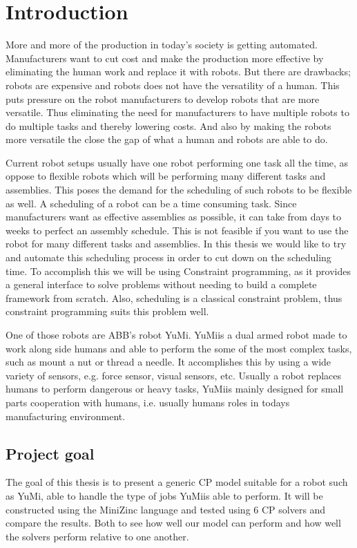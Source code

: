 \chapter{Introduction} 

More and more of the production in today's society is getting automated. Manufacturers want to cut cost and make the production more effective by eliminating the human work and replace it with robots. But there are drawbacks; robots are expensive and robots does not have the versatility of a human. This puts pressure on the robot manufacturers to develop robots that are more versatile. Thus eliminating the need for manufacturers to have multiple robots to do multiple tasks and thereby lowering costs. And also by making the robots more versatile the close the gap of what a human and robots are able to do.

Current robot setups usually have one robot performing one task all the time, as oppose to flexible robots which will be performing many different tasks and assemblies. This poses the demand for the scheduling of such robots to be flexible as well. A scheduling of a robot can be a time consuming task. Since manufacturers want as effective assemblies as possible, it can take from days to weeks to perfect an assembly schedule. This is not feasible if you want to use the robot for many different tasks and assemblies. In this thesis we would like to try and automate this scheduling process in order to cut down on the scheduling time. To accomplish this we will be using Constraint programming, as it provides a general interface to solve problems without needing to build a complete framework from scratch. Also, scheduling is a classical constraint problem, thus constraint programming suits this problem well.

One of those robots are ABB's robot YuMi\textsuperscript\textregistered. YuMi\textsuperscript\textregistered is a dual armed robot made to work along side humans and able to perform the some of the most complex tasks, such as mount a nut or thread a needle.\cite{_yumi_} It accomplishes this by using a wide variety of sensors, e.g. force sensor, visual sensors, etc. Usually a robot replaces humans to perform dangerous or heavy tasks, YuMi\textsuperscript\textregistered is mainly designed for small parts cooperation with humans, i.e. usually humans roles in todays manufacturing environment.



\section{Project goal}
The goal of this thesis is to present a generic CP model suitable for a robot such as YuMi\textsuperscript\textregistered, able to handle the type of jobs YuMi\textsuperscript\textregistered is able to perform. It will be constructed using the MiniZinc language and tested using 6 CP solvers and compare the results. Both to see how well our model can perform and how well the solvers perform relative to one another.

